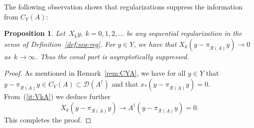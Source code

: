 \documentclass[12pt]{amsart}
\newcommand{\lr}[1]{\left(#1\right)}
\newcommand{\domain}{\mathcal D}
\newcommand{\range}{\mathcal R}
\newcommand{\Ad}{A^\dag}
\newcommand{\pr}{\pi_{\overline{\range(A)}}}
\newtheorem{proposition}{Proposition}%
\theoremstyle{remark}
\begin{document}
The following observation shows that regularizations suppress the
information from $C_Y(A)$:%
\begin{proposition}
  \label{kegel-weg}
  Let~$X_k y,\ k=0,1,2,\dots$ be any sequential regularization in the sense of Definition~\ref{def:seq-reg}. 
 For $y\in Y$, %
  we have that \linebreak $X_{k}\lr{y - \pr y} \to 0$ as~$k\to \infty$. Thus the conal part is asymptotically suppressed.
\end{proposition}
\begin{proof}
 As mentioned in Remark~\ref{rem:CYA}, we have for all $y \in Y$ that $y - \pr y \in C_Y(A) \subset \domain(\Ad)$ and that $x_*(y - \pr y)=0$. From~(\ref{it:VkA}) we deduce further 
  $$
 X_{k}\lr{y - \pr y} \longrightarrow \Ad\lr{y - \pr y} =0.
 $$
 This completes the proof.
\end{proof}
\end{document}
